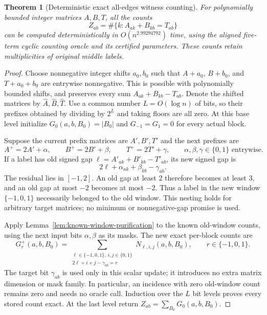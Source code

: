 \documentclass[11pt]{article}
\newtheorem{theorem}{Theorem}
\begin{document}
\begin{theorem}[Deterministic exact all-edges witness counting]
\label{thm:deterministic-exact-witness-counting}
For polynomially bounded integer matrices $A,B,T$, all the counts
\[
 Z_{ab}=\#\{k:A_{ak}+B_{kb}=T_{ab}\}
\]
can be computed deterministically in $O(n^{2.99294792})$ time, using the
aligned five-term cyclic counting oracle and its certified parameters.
These counts retain multiplicities of original middle labels.
\end{theorem}
\begin{proof}
Choose nonnegative integer shifts $a_0,b_0$ such that
$A+a_0$, $B+b_0$, and $T+a_0+b_0$ are entrywise nonnegative.  This
is possible with polynomially bounded shifts, and preserves every
sum $A_{ak}+B_{kb}-T_{ab}$.  Denote the shifted matrices by
$\widehat A,\widehat B,\widehat T$.  Use a common number $L=O(\log n)$
of bits, so their prefixes obtained by dividing by $2^L$ and taking
floors are all zero.  At this base level initialize
$G_0(a,b,B_0)=|B_0|$ and $G_{-1}=G_1=0$ for every actual block.

Suppose the current prefix matrices are $A',B',T'$ and the next
prefixes are
\[
 A^+=2A'+\alpha,\qquad B^+=2B'+\beta,\qquad
 T^+=2T'+\gamma,
 \qquad \alpha,\beta,\gamma\in\{0,1\}\text{ entrywise}.
\]
If a label has old signed gap $\ell=A'_{ak}+B'_{kb}-T'_{ab}$, its
new signed gap is
\[
 2\ell+\alpha_{ak}+\beta_{kb}-\gamma_{ab}.
\]
The residual lies in $[-1,2]$.  An old gap at least $2$ therefore
becomes at least $3$, and an old gap at most $-2$ becomes at most $-2$.
Thus a label in the new window $\{-1,0,1\}$ necessarily belonged
to the old window.  This nesting holds for arbitrary target matrices;
no minimum or nonnegative-gap promise is used.

Apply Lemma~\ref{lem:known-window-purification} to the known old-window
counts, using the next input bits $\alpha,\beta$ as its masks.  The
new exact per-block counts are
\[
 G_r^+(a,b,B_0)=
 \sum_{\substack{\ell\in\{-1,0,1\},\ i,j\in\{0,1\}\\
                 2\ell+i+j-\gamma_{ab}=r}}
 N_{\ell,i,j}(a,b,B_0),\qquad r\in\{-1,0,1\}.
\]
The target bit $\gamma_{ab}$ is used only in this scalar update;
it introduces no extra matrix dimension or mask family.  In particular,
an incidence with zero old-window count remains zero and needs no
oracle call.  Induction over the $L$ bit levels proves every stored
count exact.  At the last level return $Z_{ab}=\sum_{B_0}G_0(a,b,B_0)$.


\end{proof}
\end{document}

